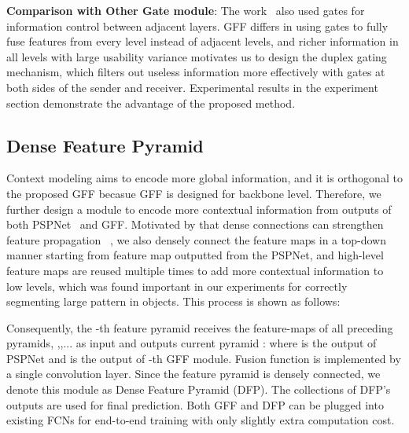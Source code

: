 \documentclass[letterpaper]{article} \usepackage{aaai20}  \usepackage{times}  \usepackage{helvet} \usepackage{courier}  \usepackage[hyphens]{url}  \usepackage{graphicx} \urlstyle{rm} \def\UrlFont{\rm}  \usepackage{graphicx}  \usepackage{amsmath}
\begin{document}
\noindent
\textbf{Comparison with Other Gate module}: 
The work~\cite{ding2018context} also used gates for information control between adjacent layers. GFF differs in using gates to fully fuse features
from every level instead of adjacent levels, and richer information in all levels with large usability variance motivates us to design the duplex gating mechanism, which filters out useless information more effectively with gates at
both sides of the sender and receiver. Experimental results in the experiment section demonstrate the advantage of the proposed method.


\subsection{Dense Feature Pyramid}
Context modeling aims to encode more global information, and it is orthogonal to the proposed GFF becasue GFF is designed for backbone level. Therefore, we further design a module to encode more contextual information from outputs of both PSPNet~\cite{pspnet} and GFF. Motivated by that dense connections can strengthen feature propagation ~\cite{densenet}, we also densely connect the feature maps in a top-down manner starting from feature map outputted from the PSPNet, and high-level feature maps are reused multiple times to add more contextual information to low levels, which was found important in our experiments for correctly segmenting large pattern in objects. This process is shown as follows:
    
Consequently, the -th feature pyramid receives the feature-maps of all preceding pyramids, ,,... as input and outputs current pyramid : where  is the output of PSPNet and  is the output of -th GFF module. Fusion function  is implemented by a single convolution layer. Since the feature pyramid is densely connected, we denote this module as Dense Feature Pyramid (DFP). 
The collections of DFP's outputs {  } are used for final prediction. Both GFF and DFP can be plugged into existing FCNs for end-to-end training with only slightly extra computation cost. 
\end{document}

